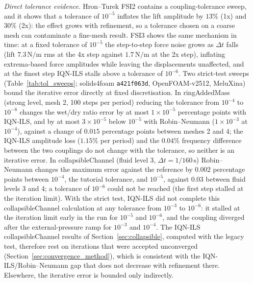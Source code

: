 \emph{Direct tolerance evidence.}
Hron--Turek FSI2 contains a coupling-tolerance sweep, and it shows that a tolerance of $10^{-5}$ inflates the lift amplitude by $13\%$ (1x) and $30\%$ (2x): the effect grows with refinement, so a tolerance chosen on a coarse mesh can contaminate a fine-mesh result.
FSI3 shows the same mechanism in time: at a fixed tolerance of $10^{-5}$ the step-to-step force noise grows as $\Delta t$ falls (lift $7.3\,\mathrm{N/m}$ rms at the 4x step against $1.7\,\mathrm{N/m}$ at the 2x step), inflating extrema-based force amplitudes while leaving the displacements unaffected, and at the finest step IQN-ILS stalls above a tolerance of $10^{-6}$.
Two strict-test sweeps (Table~\ref{tab:tol_sweeps}; solids4foam \texttt{a421f063d}, OpenFOAM-v2512, MeluXina) bound the iterative error directly at fixed discretisation.
In ringAddedMass (strong level, mesh 2, 100 steps per period) reducing the tolerance from $10^{-4}$ to $10^{-8}$ changes the wet/dry ratio error by at most $1\times10^{-5}$ percentage points with IQN-ILS, and by at most $3\times10^{-5}$ below $10^{-5}$ with Robin--Neumann ($1\times10^{-3}$ at $10^{-4}$), against a change of $0.015$ percentage points between meshes 2 and 4; the IQN-ILS amplitude loss ($1.15\%$ per period) and the $0.04\%$ frequency difference between the two couplings do not change with the tolerance, so neither is an iterative error.
In collapsibleChannel (fluid level 3, $\Delta t = 1/160\,\mathrm{s}$) Robin--Neumann changes the maximum error against the reference by $0.002$ percentage points between $10^{-4}$, the tutorial tolerance, and $10^{-5}$, against $0.03$ between fluid levels 3 and 4; a tolerance of $10^{-6}$ could not be reached (the first step stalled at the iteration limit).
With the strict test, IQN-ILS did not complete this collapsibleChannel calculation at any tolerance from $10^{-3}$ to $10^{-6}$: it stalled at the iteration limit early in the run for $10^{-5}$ and $10^{-6}$, and the coupling diverged after the external-pressure ramp for $10^{-3}$ and $10^{-4}$.
The IQN-ILS collapsibleChannel results of Section~\ref{sec:collapsible}, computed with the legacy test, therefore rest on iterations that were accepted unconverged (Section~\ref{sec:convergence_method}), which is consistent with the IQN-ILS/Robin--Neumann gap that does not decrease with refinement there.
Elsewhere, the iterative error is bounded only indirectly.

